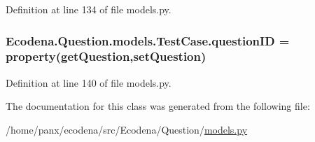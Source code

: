 Definition at line 134 of file models.py.

\hypertarget{class_ecodena_1_1_question_1_1models_1_1_test_case_a736b919e7fbdde24e0aa823bd3ed4431}{
\subsubsection[{questionID}]{\setlength{\rightskip}{0pt plus 5cm}Ecodena.Question.models.TestCase.questionID = property(getQuestion,setQuestion)}}
\label{d4/d96/class_ecodena_1_1_question_1_1models_1_1_test_case_a736b919e7fbdde24e0aa823bd3ed4431}


Definition at line 140 of file models.py.



The documentation for this class was generated from the following file:\begin{DoxyCompactItemize}
\item 
/home/panx/ecodena/src/Ecodena/Question/\hyperlink{_question_2models_8py}{models.py}\end{DoxyCompactItemize}
